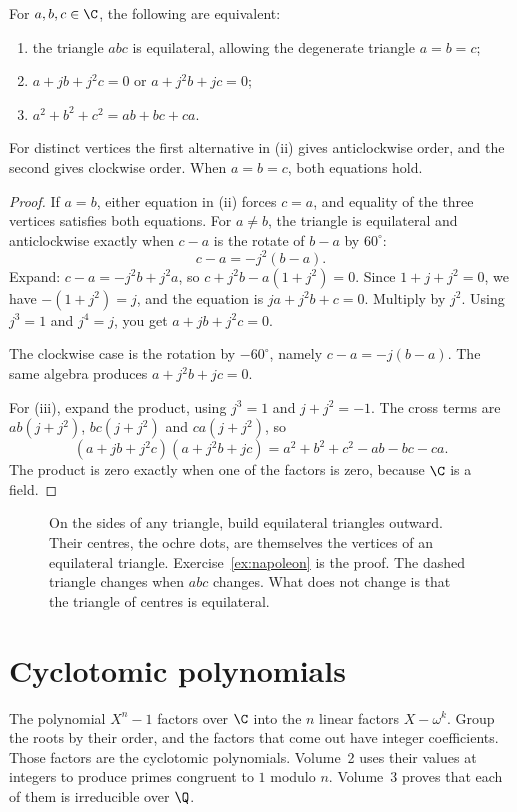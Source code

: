 \begin{proposition}\label{prop:equilateral}
For $a,b,c\in\C$, the following are equivalent:
\begin{enumerate}[label=(\roman*)]
\item the triangle $abc$ is equilateral, allowing the degenerate triangle $a=b=c$;
\item $a+jb+j^2c=0$ or $a+j^2b+jc=0$;
\item $a^2+b^2+c^2=ab+bc+ca$.
\end{enumerate}
For distinct vertices the first alternative in (ii) gives anticlockwise order, and the second gives clockwise order. When $a=b=c$, both equations hold.
\end{proposition}
\begin{proof}
If $a=b$, either equation in (ii) forces $c=a$, and equality of the three vertices satisfies both equations. For $a\ne b$, the triangle is equilateral and anticlockwise exactly when $c-a$ is the rotate of $b-a$ by $60^\circ$:
\[
c-a=-j^2(b-a).
\]
Expand: $c-a=-j^2b+j^2a$, so $c+j^2b-a(1+j^2)=0$. Since $1+j+j^2=0$, we have $-(1+j^2)=j$, and the equation is $ja+j^2b+c=0$. Multiply by $j^2$. Using $j^3=1$ and $j^4=j$, you get $a+jb+j^2c=0$.

The clockwise case is the rotation by $-60^\circ$, namely $c-a=-j(b-a)$. The same algebra produces $a+j^2b+jc=0$.

For (iii), expand the product, using $j^3=1$ and $j+j^2=-1$. The cross terms are $ab(j+j^2)$, $bc(j+j^2)$ and $ca(j+j^2)$, so
\[
(a+jb+j^2c)(a+j^2b+jc)=a^2+b^2+c^2-ab-bc-ca.
\]
The product is zero exactly when one of the factors is zero, because $\C$ is a field.
\end{proof}

\begin{figure}[ht]
\centering
{}
\caption{On the sides of any triangle, build equilateral triangles outward. Their centres, the ochre dots, are themselves the vertices of an equilateral triangle. Exercise~\ref{ex:napoleon} is the proof. The dashed triangle changes when \(abc\) changes. What does not change is that the triangle of centres is equilateral.}
\label{fig:napoleon}
\end{figure}

\section{Cyclotomic polynomials}

The polynomial $X^n-1$ factors over $\C$ into the $n$ linear factors $X-\omega^k$. Group the roots by their order, and the factors that come out have integer coefficients. Those factors are the cyclotomic polynomials. Volume~2 uses their values at integers to produce primes congruent to $1$ modulo $n$. Volume~3 proves that each of them is irreducible over $\Q$.

